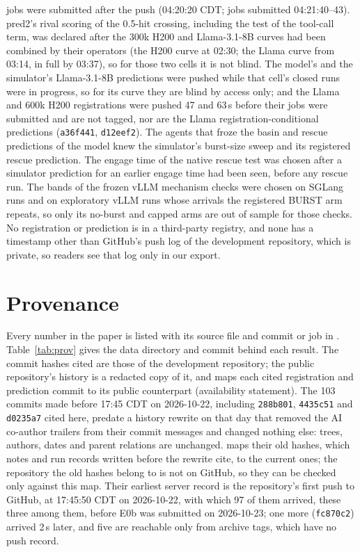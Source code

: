 jobs were submitted after the push (04:20:20 CDT; jobs submitted 04:21:40--43). pred2's rival scoring of the 0.5-hit crossing, including the test of the tool-call term, was declared after the 300k H200 and Llama-3.1-8B curves had been combined by their operators (the H200 curve at 02:30; the Llama curve from 03:14, in full by 03:37), so for those two cells it is not blind. The model's and the simulator's Llama-3.1-8B predictions were pushed while that cell's closed runs were in progress, so for its curve they are blind by access only; and the Llama and 600k H200 registrations were pushed 47 and 63\,s before their jobs were submitted and are not tagged, nor are the Llama registration-conditional predictions (\texttt{a36f441}, \texttt{d12eef2}). The agents that froze the basin and rescue predictions of the model knew the simulator's burst-size sweep and its registered rescue prediction. The engage time of the native rescue test was chosen after a simulator prediction for an earlier engage time had been seen, before any rescue run. The bands of the frozen vLLM mechanism checks were chosen on SGLang runs and on exploratory vLLM runs whose arrivals the registered BURST arm repeats, so only its no-burst and capped arms are out of sample for those checks. No registration or prediction is in a third-party registry, and none has a timestamp other than GitHub's push log of the development repository, which is private, so readers see that log only in our export.

\section{Provenance}\label{app:prov}
Every number in the paper is listed with its source file and commit or job in . Table~\ref{tab:prov} gives the data directory and commit behind each result. The commit hashes cited are those of the development repository; the public repository's history is a redacted copy of it, and  maps each cited registration and prediction commit to its public counterpart (availability statement). The 103 commits made before 17:45 CDT on 2026-10-22, including \texttt{288b801}, \texttt{4435c51} and \texttt{d0235a7} cited here, predate a history rewrite on that day that removed the AI co-author trailers from their commit messages and changed nothing else: trees, authors, dates and parent relations are unchanged.  maps their old hashes, which notes and run records written before the rewrite cite, to the current ones; the repository the old hashes belong to is not on GitHub, so they can be checked only against this map. Their earliest server record is the repository's first push to GitHub, at 17:45:50 CDT on 2026-10-22, with which 97 of them arrived, these three among them, before E0b was submitted on 2026-10-23; one more (\texttt{fc870c2}) arrived 2\,s later, and five are reachable only from archive tags, which have no push record.

